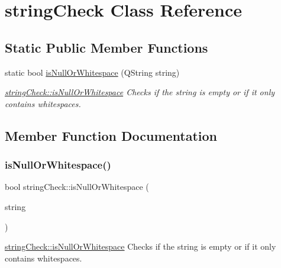 \hypertarget{classstring_check}{}\section{string\+Check Class Reference}
\label{classstring_check}
\subsection*{Static Public Member Functions}
\begin{DoxyCompactItemize}
\item 
static bool \mbox{\hyperlink{classstring_check_a25a6eebd6a36799e3a2c8335288929d2}{is\+Null\+Or\+Whitespace}} (Q\+String string)
\begin{DoxyCompactList}\small\item\em \mbox{\hyperlink{classstring_check_a25a6eebd6a36799e3a2c8335288929d2}{string\+Check\+::is\+Null\+Or\+Whitespace}} Checks if the string is empty or if it only contains whitespaces. \end{DoxyCompactList}\end{DoxyCompactItemize}


\subsection{Member Function Documentation}
\mbox{\label{classstring_check_a25a6eebd6a36799e3a2c8335288929d2}} 
\subsubsection{\texorpdfstring{is\+Null\+Or\+Whitespace()}{isNullOrWhitespace()}}
{\footnotesize\ttfamily bool string\+Check\+::is\+Null\+Or\+Whitespace (\begin{DoxyParamCaption}\item[{Q\+String}]{string }\end{DoxyParamCaption})\hspace{0.3cm}{\ttfamily [static]}}



\mbox{\hyperlink{classstring_check_a25a6eebd6a36799e3a2c8335288929d2}{string\+Check\+::is\+Null\+Or\+Whitespace}} Checks if the string is empty or if it only contains whitespaces. 


